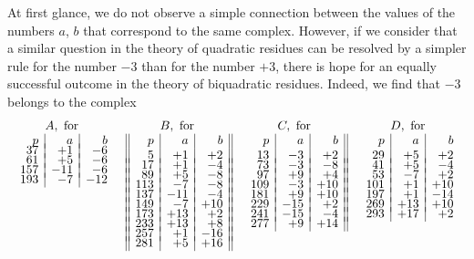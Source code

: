 \documentclass[twoside,12pt]{memoir}
\begin{document}
At first glance, we do not observe a simple connection between the values of the numbers \(a\), \(b\) that correspond to the same complex. However, if we consider that a similar question in the theory of quadratic residues can be resolved by a simpler rule for the number \(-3\) than for the number \(+3\), there is hope for an equally successful outcome in the theory of biquadratic residues. Indeed, we find that \(-3\) belongs to the complex
\[\begin{array}{cccc}
\begin{array}[t]{r|r|r} 
\multicolumn{3}{c}{A, \text{ for }}\\
p & a & b \\[-4pt]
37&+1&-6\\[-4pt]
61&+5&-6\\[-4pt]
157&-11&-6\\[-4pt]
193 & -7 & -12 
\end{array} & 
\begin{array}[t]{||r|r|r||} 
\multicolumn{3}{c}{B, \text{ for }}\\
p & a & b \\
5&+1&+2\\[-4pt]
17&+1&-4\\[-4pt]
89&+5&-8\\[-4pt]
113&-7&-8\\[-4pt]
137&-11&-4\\[-4pt]
149&-7&+10\\[-4pt]
173&+13&+2\\[-4pt]
233&+13&+8\\[-4pt]
257&+1&-16\\[-4pt]
281&+5&+16
\end{array}&
\begin{array}[t]{r|r|r||} 
\multicolumn{3}{c}{C, \text{ for }}\\
p & a & b \\
13 & -3 & +2 \\[-4pt]
73&-3&-8\\[-4pt]
97&+9&+4\\[-4pt]
109 & -3 & +10 \\[-4pt]
181 & +9 & +10 \\[-4pt]
229 & -15 & +2 \\[-4pt]
241&-15&-4 \\[-4pt]
277 & +9 & +14 
\end{array}
&
\begin{array}[t]{r|r|r} 
\multicolumn{3}{c}{D, \text{ for }}\\
p & a & b \\
29&+5&+2\\[-4pt]
41&+5&-4\\[-4pt]
53&-7&+2\\[-4pt]
101&+1&+10\\[-4pt]
197&+1&-14\\[-4pt]
269&+13&+10\\[-4pt]
293&+17&+2 
\end{array}
\end{array}\]
\end{document}
